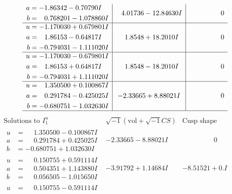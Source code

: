 \documentclass[1p]{elsarticle_modified}
\theoremstyle{definition}
\newcommand{\I}{\sqrt{-1}}
\begin{document}
$$\begin{array}{c|c|c}
\begin{aligned}
a &= -1.86342 - 0.70790 I \\
b &= \phantom{-}0.768201 - 1.078860 I\end{aligned}
 & \phantom{-}4.01736 - 12.84630 I & \phantom{-0.000000 } 0 \\ \hline\begin{aligned}
u &= -1.170030 + 0.679801 I \\
a &= \phantom{-}1.86153 - 0.64817 I \\
b &= -0.794031 - 1.111020 I\end{aligned}
 & \phantom{-}1.8548 + 18.2010 I & \phantom{-0.000000 } 0 \\ \hline\begin{aligned}
u &= -1.170030 - 0.679801 I \\
a &= \phantom{-}1.86153 + 0.64817 I \\
b &= -0.794031 + 1.111020 I\end{aligned}
 & \phantom{-}1.8548 - 18.2010 I & \phantom{-0.000000 } 0 \\ \hline\begin{aligned}
u &= \phantom{-}1.350500 + 0.100867 I \\
a &= \phantom{-}0.291784 - 0.425025 I \\
b &= -0.680751 - 1.032630 I\end{aligned}
 & -2.33665 + 8.88021 I & \phantom{-0.000000 } 0\\
 \hline 
 \end{array}$$\newpage$$\begin{array}{c|c|c}  
\text{Solutions to }I^u_{1}& \I (\text{vol} + \sqrt{-1}CS) & \text{Cusp shape}\\
 \hline 
\begin{aligned}
u &= \phantom{-}1.350500 - 0.100867 I \\
a &= \phantom{-}0.291784 + 0.425025 I \\
b &= -0.680751 + 1.032630 I\end{aligned}
 & -2.33665 - 8.88021 I & \phantom{-0.000000 } 0 \\ \hline\begin{aligned}
u &= \phantom{-}0.150755 + 0.591114 I \\
a &= \phantom{-}0.504351 + 1.143880 I \\
b &= \phantom{-}0.056505 - 1.015650 I\end{aligned}
 & -3.91792 + 1.14684 I & -8.51521 + 0. I\phantom{ +0.000000I} \\ \hline\begin{aligned}
u &= \phantom{-}0.150755 - 0.591114 I \\

\end{aligned}
\end{array}$$
\end{document}
